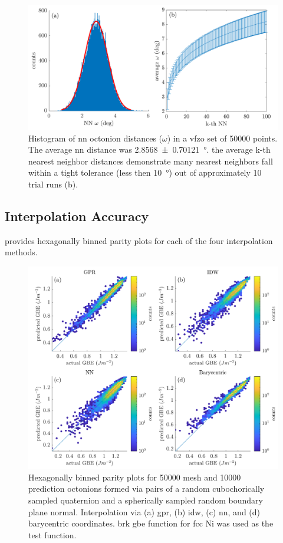 \documentclass[final,twocolumn,12pt]{elsarticle}
\newcommand{\outpt}{prediction}
\newcommand{\nnomega}{2.8568 \pm 0.70121}
\begin{document}
\begin{figure}
\centering
\includegraphics[scale=1]{nnhist-knn-50000.png}
\caption{Histogram of \gls{nn} octonion distances ($\omega$) in a \gls{vfzo} set of \num{50000} points. The average \gls{nn} distance was \SI{\nnomega}{\degree}. the average k-th nearest neighbor distances demonstrate many nearest neighbors fall within a tight tolerance (less then \SI{10}{\degree}) out of approximately 10 trial runs (b).}
\label{fig:nnhist-knn-50000}
\end{figure}

\subsection{Interpolation Accuracy}
\label{sec:results:accuracy}

 provides hexagonally binned parity plots \cite{beanHexscatter2020} for each of the four interpolation methods.
\begin{figure}
    \centering
    \includegraphics[scale=1]{brkparity50000.png}
    \caption{Hexagonally binned parity plots for \num{50000} mesh and \num{10000} \outpt{} octonions formed via pairs of a random cubochorically sampled quaternion and a spherically sampled random boundary plane normal. Interpolation via (a) \gls{gpr}, (b) \gls{idw}, (c) \gls{nn}, and (d) barycentric coordinates.  \gls{brk} \gls{gbe} function for \gls{fcc} Ni was used as the test function.}
    \label{fig:brkparity50000}
\end{figure}
\end{document}
